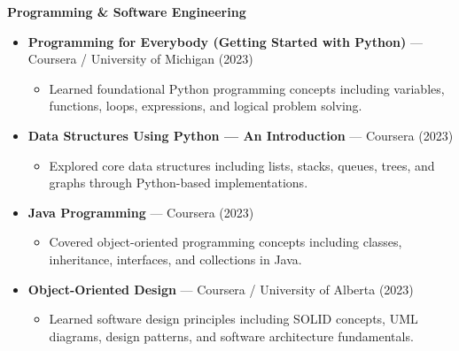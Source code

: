 \documentclass[a4paper,11pt]{article}
\begin{document}
\textbf{Programming \& Software Engineering}
\begin{itemize}

    \item \textbf{Programming for Everybody (Getting Started with Python)} --- Coursera / University of Michigan (2023)

    \begin{itemize}
        \item Learned foundational Python programming concepts including variables, functions, loops, expressions, and logical problem solving.
    \end{itemize}

    \item \textbf{Data Structures Using Python --- An Introduction} --- Coursera (2023)

    \begin{itemize}
        \item Explored core data structures including lists, stacks, queues, trees, and graphs through Python-based implementations.
    \end{itemize}

    \item \textbf{Java Programming} --- Coursera (2023)

    \begin{itemize}
        \item Covered object-oriented programming concepts including classes, inheritance, interfaces, and collections in Java.
    \end{itemize}

    \item \textbf{Object-Oriented Design} --- Coursera / University of Alberta (2023)

    \begin{itemize}
        \item Learned software design principles including SOLID concepts, UML diagrams, design patterns, and software architecture fundamentals.
    \end{itemize}

\end{itemize}

\vspace{3pt}
\end{document}
